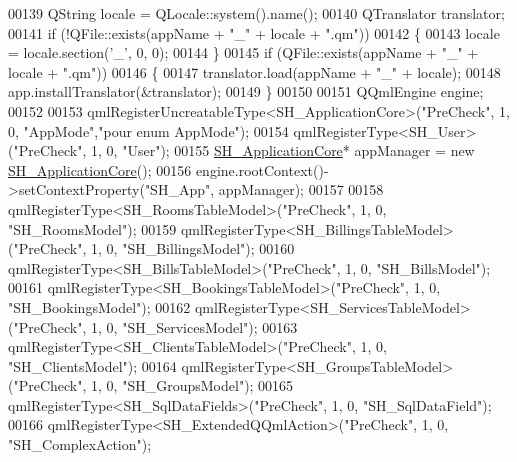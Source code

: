 \begin{DoxyCode}
{00139         QString locale = QLocale::system().name();
00140         QTranslator translator;
00141         \textcolor{keywordflow}{if} (!QFile::exists(appName + \textcolor{stringliteral}{"\_"} + locale + \textcolor{stringliteral}{".qm"}))
00142         \{
00143             locale = locale.section(\textcolor{charliteral}{'\_'}, 0, 0);
00144         \}
00145         \textcolor{keywordflow}{if} (QFile::exists(appName + \textcolor{stringliteral}{"\_"} + locale + \textcolor{stringliteral}{".qm"}))
00146         \{
00147             translator.load(appName + \textcolor{stringliteral}{"\_"} + locale);
00148             app.installTranslator(&translator);
00149         \}
00150 
00151         QQmlEngine engine;
00152 
00153         qmlRegisterUncreatableType<SH\_ApplicationCore>(\textcolor{stringliteral}{"PreCheck"}, 1, 0, \textcolor{stringliteral}{"AppMode"},\textcolor{stringliteral}{"pour enum AppMode"});
00154         qmlRegisterType<SH\_User>(\textcolor{stringliteral}{"PreCheck"}, 1, 0, \textcolor{stringliteral}{"User"});
00155         \hyperlink{classSH__ApplicationCore}{SH\_ApplicationCore}* appManager = \textcolor{keyword}{new} 
      \hyperlink{classSH__ApplicationCore}{SH\_ApplicationCore}();
00156         engine.rootContext()->setContextProperty(\textcolor{stringliteral}{"SH\_App"}, appManager);
00157 
00158         qmlRegisterType<SH\_RoomsTableModel>(\textcolor{stringliteral}{"PreCheck"}, 1, 0, \textcolor{stringliteral}{"SH\_RoomsModel"});
00159         qmlRegisterType<SH\_BillingsTableModel>(\textcolor{stringliteral}{"PreCheck"}, 1, 0, \textcolor{stringliteral}{"SH\_BillingsModel"});
00160         qmlRegisterType<SH\_BillsTableModel>(\textcolor{stringliteral}{"PreCheck"}, 1, 0, \textcolor{stringliteral}{"SH\_BillsModel"});
00161         qmlRegisterType<SH\_BookingsTableModel>(\textcolor{stringliteral}{"PreCheck"}, 1, 0, \textcolor{stringliteral}{"SH\_BookingsModel"});
00162         qmlRegisterType<SH\_ServicesTableModel>(\textcolor{stringliteral}{"PreCheck"}, 1, 0, \textcolor{stringliteral}{"SH\_ServicesModel"});
00163         qmlRegisterType<SH\_ClientsTableModel>(\textcolor{stringliteral}{"PreCheck"}, 1, 0, \textcolor{stringliteral}{"SH\_ClientsModel"});
00164         qmlRegisterType<SH\_GroupsTableModel>(\textcolor{stringliteral}{"PreCheck"}, 1, 0, \textcolor{stringliteral}{"SH\_GroupsModel"});
00165         qmlRegisterType<SH\_SqlDataFields>(\textcolor{stringliteral}{"PreCheck"}, 1, 0, \textcolor{stringliteral}{"SH\_SqlDataField"});
00166         qmlRegisterType<SH\_ExtendedQQmlAction>(\textcolor{stringliteral}{"PreCheck"}, 1, 0, \textcolor{stringliteral}{"SH\_ComplexAction"});
}
\end{DoxyCode}
